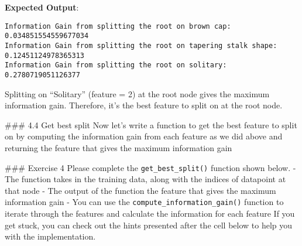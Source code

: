 \documentclass[11pt]{article}
\begin{document}
    \textbf{Expected Output}:

\begin{verbatim}
Information Gain from splitting the root on brown cap:  0.034851554559677034
Information Gain from splitting the root on tapering stalk shape:  0.12451124978365313
Information Gain from splitting the root on solitary:  0.2780719051126377
\end{verbatim}

    Splitting on ``Solitary'' (feature = 2) at the root node gives the
maximum information gain. Therefore, it's the best feature to split on
at the root node.

    \#\#\# 4.4 Get best split Now let's write a function to get the best
feature to split on by computing the information gain from each feature
as we did above and returning the feature that gives the maximum
information gain

\#\#\# Exercise 4 Please complete the \texttt{get\_best\_split()}
function shown below. - The function takes in the training data, along
with the indices of datapoint at that node - The output of the function
the feature that gives the maximum information gain - You can use the
\texttt{compute\_information\_gain()} function to iterate through the
features and calculate the information for each feature If you get
stuck, you can check out the hints presented after the cell below to
help you with the implementation.
\end{document}
